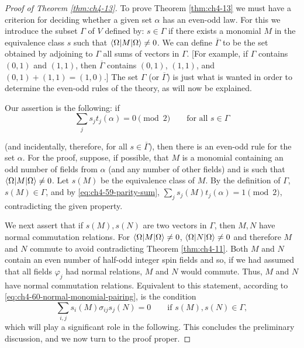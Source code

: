 \begin{proof}[Proof of Theorem \ref{thm:ch4-13}]

To prove Theorem \ref{thm:ch4-13} we must have a criterion for deciding whether a given
set $\alpha$ has an even-odd law.  For this we introduce the subset $\Gamma$
of $V$ defined by: $s\in\Gamma$ if there exists a monomial $M$ in the
equivalence class $s$ such that $\langle \Omega\rvert M\lvert \Omega\rangle\ne0$.  We can
define $\overline\Gamma$ to be the set obtained by adjoining to $\Gamma$ all
sums of vectors in $\Gamma$.  [For example, if $\Gamma$ contains $(0,1)$ and
$(1,1)$, then $\overline\Gamma$ contains $(0,1)$, $(1,1)$, and
$(0,1)+(1,1)=(1,0)$.]  The set $\Gamma$ (or $\overline\Gamma$) is just what
is wanted in order to determine the even-odd rules of the theory, as will now
be explained.

Our assertion is the following: if
\begin{equation}
  \sum_j s_jt_j(\alpha)=0\pmod 2
  \qquad\text{for all }s\in\Gamma
  \tag{4-64}\label{eq:ch4-64-even-odd-criterion}
\end{equation}

(and incidentally, therefore, for all $s\in\overline\Gamma$), then there is an
even-odd rule for the set $\alpha$.  For the proof, suppose, if possible, that
$M$ is a monomial containing an odd number of fields from $\alpha$ (and any
number of other fields) and is such that $\langle \Omega\rvert M\lvert \Omega\rangle\ne0$.
Let $s(M)$ be the equivalence class of $M$.  By the definition of $\Gamma$,
$s(M)\in\Gamma$, and by \eqref{eq:ch4-59-parity-sum}, $\sum_js_j(M)t_j(\alpha)=1\pmod2$,
contradicting the given property.

We next assert that if $s(M),s(N)$ are two vectors in $\Gamma$, then $M,N$
have normal commutation relations.  For $\langle \Omega\rvert M\lvert \Omega\rangle\ne0$,
$\langle \Omega\rvert N\lvert \Omega\rangle\ne0$ and therefore $M$ and $N$ commute to avoid
contradicting Theorem \ref{thm:ch4-11}.  Both $M$ and $N$ contain an even number of
half-odd integer
spin fields and so, if we had assumed that all fields $\varphi_j$ had normal
relations, $M$ and $N$ would commute.  Thus, $M$ and $N$ have normal
commutation relations.  Equivalent to this statement, according to \eqref{eq:ch4-60-normal-monomial-pairing}, is
the condition
\begin{equation}
  \sum_{i,j}s_i(M)\sigma_{ij}s_j(N)=0
  \qquad\text{if }s(M),s(N)\in\Gamma,
  \tag{4-65}\label{eq:ch4-65-gamma-orthogonality}
\end{equation}
which will play a significant role in the following.  This concludes the
preliminary discussion, and we now turn to the proof proper.


\end{proof}
